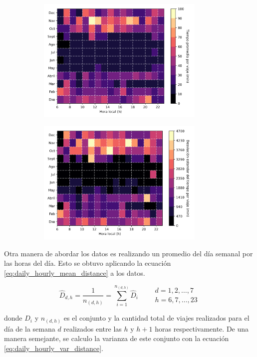 \begin{figure}[H]
    \centering
    \begin{subfigure}[b]{8cm}
        \includegraphics[width=8cm]{Graphics/monthly_hourly_mean_time_travel.png}
    \end{subfigure}
    \begin{subfigure}[b]{8cm}
        \includegraphics[width=8cm]{Graphics/monthly_hourly_var_time_travel.png}
    \end{subfigure}
\end{figure}

Otra manera de abordar los datos es realizando un promedio del día semanal por las horas del día. Esto se obtuvo aplicando la ecuación \ref{eq:daily_hourly_mean_distance} a los datos.

\begin{equation}
    \hat{D}_{d,h} = \frac{1}{n_{(d,h)}} = \sum_{i=1}^{n_{(d,h)}} \hat{D}_{i} \qquad \begin{matrix}
        d=1,2,\dots,7 \\ h=6,7,\dots,23
    \end{matrix} \label{eq:daily_hourly_mean_distance}
\end{equation}

donde $D_i$ y $n_{(d,h)}$ es el conjunto y la cantidad total de viajes realizados para el día de la semana $d$ realizados entre las $h$ y $h+1$ horas respectivamente. De una manera semejante, se calculo la varianza de este conjunto con la ecuación \ref{eq:daily_hourly_var_distance}.

